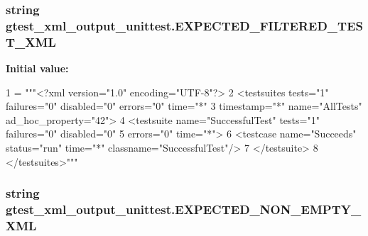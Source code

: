 \subsubsection[{\texorpdfstring{E\+X\+P\+E\+C\+T\+E\+D\+\_\+\+F\+I\+L\+T\+E\+R\+E\+D\+\_\+\+T\+E\+S\+T\+\_\+\+X\+ML}{EXPECTED_FILTERED_TEST_XML}}]{\setlength{\rightskip}{0pt plus 5cm}string gtest\+\_\+xml\+\_\+output\+\_\+unittest.\+E\+X\+P\+E\+C\+T\+E\+D\+\_\+\+F\+I\+L\+T\+E\+R\+E\+D\+\_\+\+T\+E\+S\+T\+\_\+\+X\+ML}\hypertarget{namespacegtest__xml__output__unittest_a1adb060422f833cb8b99403d13144399}{}\label{namespacegtest__xml__output__unittest_a1adb060422f833cb8b99403d13144399}
{\bfseries Initial value\+:}
\begin{DoxyCode}
1 = \textcolor{stringliteral}{"""<?xml version="1.0" encoding="UTF-8"?>}
2 \textcolor{stringliteral}{<testsuites tests="1" failures="0" disabled="0" errors="0" time="*"}
3 \textcolor{stringliteral}{            timestamp="*" name="AllTests" ad\_hoc\_property="42">}
4 \textcolor{stringliteral}{  <testsuite name="SuccessfulTest" tests="1" failures="0" disabled="0"}
5 \textcolor{stringliteral}{             errors="0" time="*">}
6 \textcolor{stringliteral}{    <testcase name="Succeeds" status="run" time="*" classname="SuccessfulTest"/>}
7 \textcolor{stringliteral}{  </testsuite>}
8 \textcolor{stringliteral}{</testsuites>"""}
\end{DoxyCode}
\subsubsection[{\texorpdfstring{E\+X\+P\+E\+C\+T\+E\+D\+\_\+\+N\+O\+N\+\_\+\+E\+M\+P\+T\+Y\+\_\+\+X\+ML}{EXPECTED_NON_EMPTY_XML}}]{\setlength{\rightskip}{0pt plus 5cm}string gtest\+\_\+xml\+\_\+output\+\_\+unittest.\+E\+X\+P\+E\+C\+T\+E\+D\+\_\+\+N\+O\+N\+\_\+\+E\+M\+P\+T\+Y\+\_\+\+X\+ML}\hypertarget{namespacegtest__xml__output__unittest_ab6a01b4b81a702e476f53b1b3c4983c0}{}\label{namespacegtest__xml__output__unittest_ab6a01b4b81a702e476f53b1b3c4983c0}
